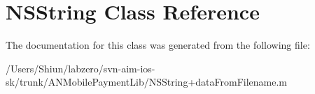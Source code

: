 \hypertarget{class_n_s_string}{
\section{NSString Class Reference}
\label{class_n_s_string}
}


The documentation for this class was generated from the following file:\begin{DoxyCompactItemize}
\item 
/Users/Shiun/labzero/svn-\/aim-\/ios-\/sk/trunk/ANMobilePaymentLib/NSString+dataFromFilename.m\end{DoxyCompactItemize}
